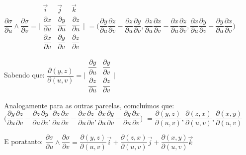 \documentclass[11pt,a4paper]{article}
\begin{document}
\begin{enumerate}
	$\dfrac{\partial \sigma}{\partial u}\wedge \dfrac{\partial \sigma}{\partial v}=
	\bigg|\begin{array}{crl}
	     \Vec{i} & \vec{j}&  \Vec{k}\\
	     \dfrac{\partial x}{\partial u} &  \dfrac{\partial y}{\partial u} &  \dfrac{\partial z}{\partial u}\\
	     \dfrac{\partial x}{\partial v} &  \dfrac{\partial y}{\partial v} &  \dfrac{\partial z}{\partial v}
	\end{array}\bigg|$
	 $= \bigg( \dfrac{\partial y}{\partial u}\dfrac{\partial z}{\partial v}- \dfrac{\partial z}{\partial u}\dfrac{\partial y}{\partial v},
	 \dfrac{\partial z}{\partial u}\dfrac{\partial x}{\partial v}- \dfrac{\partial x}{\partial u}\dfrac{\partial z}{\partial v},
	  \dfrac{\partial x}{\partial u}\dfrac{\partial y}{\partial v}- \dfrac{\partial y}{\partial u}\dfrac{\partial x}{\partial v} \bigg)$\newline
	  
	  Sabendo que:\newline
	  $\dfrac{\partial (y,z)}{\partial (u,v)}=\bigg|
	     \begin{array}{crl}
	     \dfrac{\partial y}{\partial u} &  \dfrac{\partial y}{\partial v} \\
	     \dfrac{\partial z}{\partial u} &  \dfrac{\partial z}{\partial v}
	\end{array}\bigg|$ \newline
	
	Analogamente para as outras parcelas, comcluímos que:\newline
	 $\bigg( \dfrac{\partial y}{\partial u}\dfrac{\partial z}{\partial v}- \dfrac{\partial z}{\partial u}\dfrac{\partial y}{\partial v},
	 \dfrac{\partial z}{\partial u}\dfrac{\partial x}{\partial v}- \dfrac{\partial x}{\partial u}\dfrac{\partial z}{\partial v},
	  \dfrac{\partial x}{\partial u}\dfrac{\partial y}{\partial v}- \dfrac{\partial y}{\partial u}\dfrac{\partial x}{\partial v }\bigg)$
    $=\dfrac{\partial (y,z)}{\partial (u,v)}, \dfrac{\partial (z,x)}{\partial (u,v)}, \dfrac{\partial (x,y)}{\partial (u,v)} $\newline
    
    E poratanto:\newline
    $\dfrac{\partial \sigma}{\partial u} \wedge \dfrac{\partial \sigma}{\partial v  }= 
	\dfrac{\partial (y,z)}{\partial (u,v)}\vec{i}+ \dfrac{\partial (z,x)}{\partial (u,v)}\vec{j}+ \dfrac{\partial (x,y)}{\partial (u,v)}\vec{k} $
	\newline
	

\end{enumerate}
\end{document}
